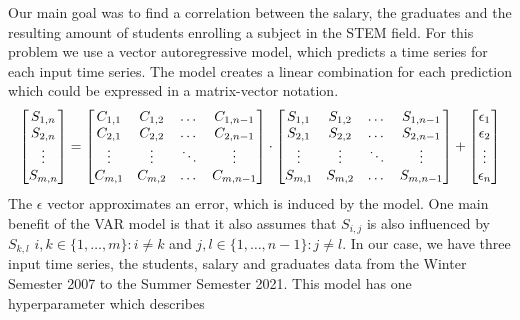 \documentclass{article}
\theoremstyle{plain}
\theoremstyle{definition}
\theoremstyle{remark}
\begin{document}
Our main goal was to find a correlation between the salary, the graduates and the resulting amount of students enrolling a subject in the STEM field. For this problem we use a vector autoregressive model, which predicts a time series 
for each input time series. The model creates a linear combination for each prediction which could be expressed in a matrix-vector notation.
\begin{equation*}
    \resizebox{\linewidth}{!}{%
        $\begin{bmatrix}
            S_{1,n}\\
            S_{2,n}\\
            \vdots \\
            S_{m,n}
        \end{bmatrix} = 
        \begin{bmatrix}
            C_{1,1} & C_{1,2} & \dots &C_{1,n-1}\\
            C_{2,1} & C_{2,2} &\dots & C_{2,n-1}\\
            \vdots & \vdots  & \ddots &\vdots\\
            C_{m,1} & C_{m,2} &\dots &C_{m,n-1}\\
        \end{bmatrix} \cdot
        \begin{bmatrix}
            S_{1,1} & S_{1,2} & \dots & S_{1,n-1}\\
            S_{2,1} & S_{2,2} & \dots & S_{2,n-1}\\
            \vdots & \vdots  & \ddots &\vdots\\
            S_{m,1} & S_{m,2} & \dots & S_{m,n-1}\\
        \end{bmatrix}+
        \begin{bmatrix}
            \epsilon_{1}\\
            \epsilon_{2}\\
            \vdots\\
            \epsilon_{n}\\
        \end{bmatrix}$%
    }
\end{equation*}
The $\epsilon$ vector approximates an error, which is induced by the model. One main benefit of the VAR model is that it also assumes that $S_{i,j}$ is also influenced by $S_{k,l}$ 
$i,k \in \{1,\dots, m\}: i\neq k$ and $j,l \in \{1,\dots, n-1\}: j\neq l$.
In our case, we have three input time series, the students, salary and graduates data from the Winter Semester 2007 to the Summer Semester 2021. This model has one hyperparameter which describes
\end{document}
